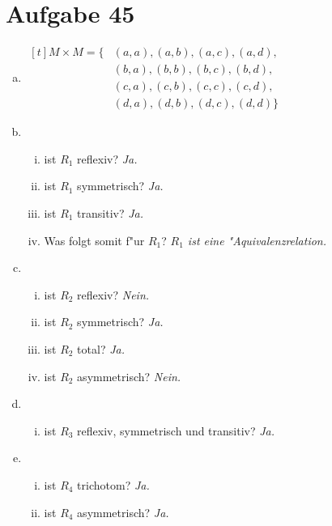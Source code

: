 \section{Aufgabe 45}

\begin{enumerate}[(a)]
    \item $\begin{aligned}[t]
            M \times M = \{&(a, a), (a, b), (a, c), (a, d), \\
                           &(b, a), (b, b), (b, c), (b, d), \\
                           &(c, a), (c, b), (c, c), (c, d), \\
                           &(d, a), (d, b), (d, c), (d, d)\}
           \end{aligned}$
    \item
        \begin{enumerate}[i)]
            \item ist $R_1$ reflexiv? \textit{Ja.}
            \item ist $R_1$ symmetrisch? \textit{Ja.}
            \item ist $R_1$ transitiv? \textit{Ja.}
            \item Was folgt somit f"ur $R_1$? \textit{$R_1$ ist eine "Aquivalenzrelation.}
        \end{enumerate}
    \item
        \begin{enumerate}[i)]
            \item ist $R_2$ reflexiv? \textit{Nein.}
            \item ist $R_2$ symmetrisch? \textit{Ja.}
            \item ist $R_2$ total? \textit{Ja.}
            \item ist $R_2$ asymmetrisch? \textit{Nein.}
        \end{enumerate}
    \item
        \begin{enumerate}[i)]
            \item ist $R_3$ reflexiv, symmetrisch und transitiv? \textit{Ja.}
        \end{enumerate}
    \item
        \begin{enumerate}[i)]
            \item ist $R_4$ trichotom? \textit{Ja.}
            \item ist $R_4$ asymmetrisch? \textit{Ja.}
        \end{enumerate}

\end{enumerate}
